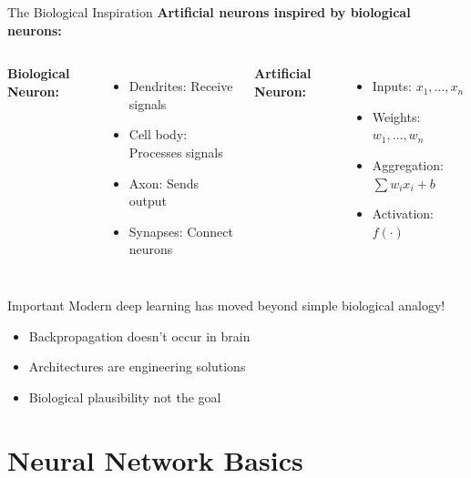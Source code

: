\documentclass[aspectratio=169]{beamer}
\begin{document}
\begin{frame}{The Biological Inspiration}
  \textbf{Artificial neurons inspired by biological neurons:}

  \vspace{0.5em}

  \begin{columns}
    \textbf{Biological Neuron:}
    \begin{itemize}
      \item Dendrites: Receive signals
      \item Cell body: Processes signals
      \item Axon: Sends output
      \item Synapses: Connect neurons
    \end{itemize}

    \textbf{Artificial Neuron:}
    \begin{itemize}
      \item Inputs: $x_1, \ldots, x_n$
      \item Weights: $w_1, \ldots, w_n$
      \item Aggregation: $\sum w_i x_i + b$
      \item Activation: $f(\cdot)$
    \end{itemize}
  \end{columns}

  \vspace{1em}

  \begin{alertbox}{Important}
    Modern deep learning has moved beyond simple biological analogy!
    \begin{itemize}
      \item Backpropagation doesn't occur in brain
      \item Architectures are engineering solutions
      \item Biological plausibility not the goal
    \end{itemize}
  \end{alertbox}
\end{frame}

\section{Neural Network Basics}
\end{document}
